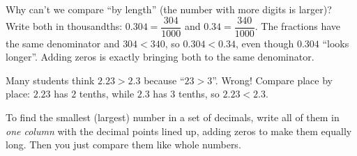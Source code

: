 \documentclass[11pt]{article}
\begin{document}
\begin{proofbox}
Why can't we compare ``by length'' (the number with more digits is larger)? Write both in thousandths:
$0.304 = \dfrac{304}{1000}$ and $0.34 = \dfrac{340}{1000}$. The fractions have the same denominator and $304 < 340$, so
$0.304 < 0.34$, even though $0.304$ ``looks longer''. Adding zeros is exactly bringing both to the same denominator.
\end{proofbox}
\begin{warnbox}
Many students think $2.23 > 2.3$ because ``$23 > 3$''. Wrong! Compare place by place: $2.23$ has $2$ tenths,
while $2.3$ has $3$ tenths, so $2.23 < 2.3$.
\end{warnbox}
\begin{tipbox}
To find the smallest (largest) number in a set of decimals, write all of them in \emph{one column} with the decimal
points lined up, adding zeros to make them equally long. Then you just compare them like whole numbers.
\end{tipbox}
\end{document}
